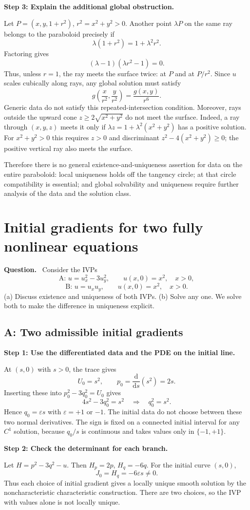 \documentclass[11pt,a4paper]{article}
\newcommand{\step}[1]{\par\medskip\textbf{#1}\par}
\newenvironment{question}{\par\smallskip\begingroup\color{ink}\textbf{Question.}\ }{\par\endgroup\medskip}
\newcommand{\problem}[1]{\clearpage\section{#1}}
\begin{document}
\step{Step 3: Explain the additional global obstruction.}
Let $P=(x,y,1+r^2)$, $r^2=x^2+y^2>0$. Another point $\lambda P$ on the same ray belongs to the paraboloid precisely if
\[
 \lambda(1+r^2)=1+\lambda^2r^2.
\]
Factoring gives
\[
 (\lambda-1)(\lambda r^2-1)=0.
\]
Thus, unless $r=1$, the ray meets the surface twice: at $P$ and at $P/r^2$. Since $u$ scales cubically along rays, any global solution must satisfy
\[
 g\!\left(\frac{x}{r^2},\frac{y}{r^2}\right)=\frac{g(x,y)}{r^6}.
\]
Generic data do not satisfy this repeated-intersection condition. Moreover, rays outside the upward cone $z\ge2\sqrt{x^2+y^2}$ do not meet the surface. Indeed, a ray through $(x,y,z)$ meets it only if $\lambda z=1+\lambda^2(x^2+y^2)$ has a positive solution. For $x^2+y^2>0$ this requires $z>0$ and discriminant $z^2-4(x^2+y^2)\ge0$; the positive vertical ray also meets the surface.

Therefore there is no general existence-and-uniqueness assertion for data on the entire paraboloid: local uniqueness holds off the tangency circle; at that circle compatibility is essential; and global solvability and uniqueness require further analysis of the data and the solution class.

\problem{Initial gradients for two fully nonlinear equations}
\begin{question}
Consider the IVPs
\[
 \text{A: }u=u_x^2-3u_y^2,\qquad u(x,0)=x^2,\quad x>0,
\]
\[
 \text{B: }u=u_xu_y,\qquad u(x,0)=x^2,\quad x>0.
\]
(a) Discuss existence and uniqueness of both IVPs. (b) Solve any one. We solve both to make the difference in uniqueness explicit.
\end{question}
\subsection*{A: Two admissible initial gradients}
\step{Step 1: Use the differentiated data and the PDE on the initial line.}
At $(s,0)$ with $s>0$, the trace gives
\[
 U_0=s^2,\qquad p_0=\frac{\mathrm d}{\mathrm ds}(s^2)=2s.
\]
Inserting these into $p_0^2-3q_0^2=U_0$ gives
\[
 4s^2-3q_0^2=s^2\quad\Longrightarrow\quad q_0^2=s^2.
\]
Hence $q_0=\varepsilon s$ with $\varepsilon=+1$ or $-1$. The initial data do not choose between these two normal derivatives. The sign is fixed on a connected initial interval for any $C^1$ solution, because $q_0/s$ is continuous and takes values only in $\{-1,+1\}$.

\step{Step 2: Check the determinant for each branch.}
Let $H=p^2-3q^2-u$. Then $H_p=2p$, $H_q=-6q$. For the initial curve $(s,0)$,
\[
 J_0=H_q=-6\varepsilon s\ne0.
\]
Thus each choice of initial gradient gives a locally unique smooth solution by the noncharacteristic characteristic construction. There are two choices, so the IVP with values alone is not locally unique.
\end{document}
